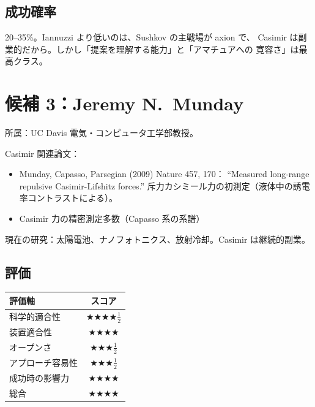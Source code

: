 \documentclass[11pt,a4paper]{article}
\def\textbf#1{#1}%
\begin{document}
\subsection{成功確率}

\textbf{20--35\%}。Iannuzzi より低いのは、Sushkov の主戦場が axion で、
Casimir は副業的だから。しかし「提案を理解する能力」と「アマチュアへの
寛容さ」は最高クラス。

\newpage

\section{候補 3：Jeremy N.\ Munday}

\begin{candidatebox}
\textbf{所属}：UC Davis 電気・コンピュータ工学部教授。

\textbf{Casimir 関連論文}：
\begin{itemize}
\item \textbf{Munday, Capasso, Parsegian (2009) Nature 457, 170}：
  ``Measured long-range repulsive Casimir-Lifshitz forces.''
  \textbf{斥力カシミール力の初測定}（液体中の誘電率コントラストによる）。
\item Casimir 力の精密測定多数（Capasso 系の系譜）
\end{itemize}

\textbf{現在の研究}：太陽電池、ナノフォトニクス、放射冷却。Casimir は継続的副業。
\end{candidatebox}

\subsection{評価}

\begin{center}
\begin{tabular}{lc}
\toprule
評価軸 & スコア \\
\midrule
科学的適合性    & ★★★★$\frac{1}{2}$ \\
装置適合性      & ★★★★ \\
オープンさ      & ★★★$\frac{1}{2}$ \\
アプローチ容易性 & ★★★$\frac{1}{2}$ \\
成功時の影響力  & ★★★★ \\
\midrule
\textbf{総合}   & \textbf{★★★★} \\
\bottomrule
\end{tabular}
\end{center}
\end{document}
